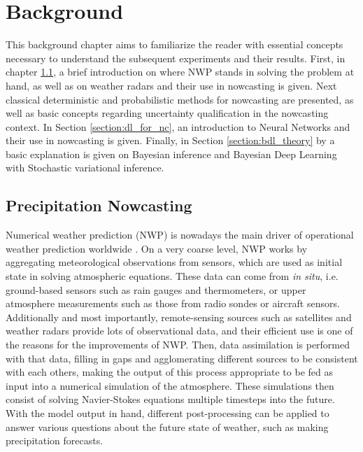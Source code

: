 \chapter{Background}
\label{chapter:background} 

This background chapter aims to familiarize the reader with essential concepts necessary to understand the subsequent experiments and their results. First, in chapter \ref{section:precip_nc}, a brief introduction on where NWP stands in solving the problem at hand, as well as on weather radars and their use in nowcasting is given. Next classical deterministic and probabilistic methods for nowcasting are presented, as well as basic concepts regarding uncertainty qualification in the nowcasting context. In Section \ref{section:dl_for_nc}, an introduction to Neural Networks and their use in nowcasting is given. Finally, in Section \ref{section:bdl_theory} by a basic explanation is given on Bayesian inference and Bayesian Deep Learning with Stochastic variational inference. 

\section{Precipitation Nowcasting}
\label{section:precip_nc}


Numerical weather prediction (NWP) is nowadays the main driver of operational weather prediction worldwide \cite{schultz_can_2021, bauer_quiet_2015}. On a very coarse level, NWP works by aggregating meteorological observations from sensors, which are used as initial state in solving atmospheric equations. These data can come from \textit{in situ}, i.e. ground-based sensors such as rain gauges and thermometers, or upper atmosphere measurements such as those from radio sondes or aircraft sensors. Additionally and most importantly, remote-sensing sources such as satellites and weather radars provide lots of observational data, and their efficient use is one of the reasons for the improvements of NWP. Then, data assimilation is performed with that data, filling in gaps and agglomerating different sources to be consistent with each others, making the output of this process appropriate to be fed as input into a numerical simulation of the atmosphere. These simulations then consist of solving Navier-Stokes equations multiple timesteps into the future. With the model output in hand, different post-processing can be applied to answer various questions about the future state of weather, such as making precipitation forecasts.

